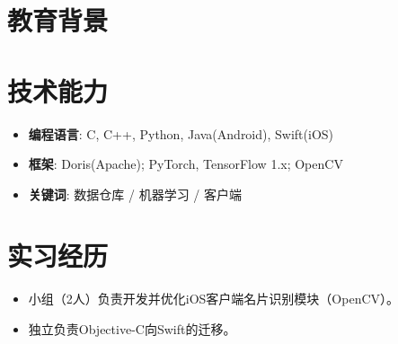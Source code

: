 \documentclass{resume}
\begin{document}


 

\section{教育背景}
\section{技术能力}
\begin{itemize}
  \item \textbf{编程语言}: C, C++, Python, Java(Android), Swift(iOS)
  \item \textbf{框架}: Doris(Apache); PyTorch, TensorFlow 1.x; OpenCV
  \item \textbf{关键词}: 数据仓库 / 机器学习 / 客户端
\end{itemize}


\section{实习经历}
\begin{itemize}
  \item 小组（2人）负责开发并优化iOS客户端名片识别模块（OpenCV）。
  \item 独立负责Objective-C向Swift的迁移。
\end{itemize}
\end{document}
